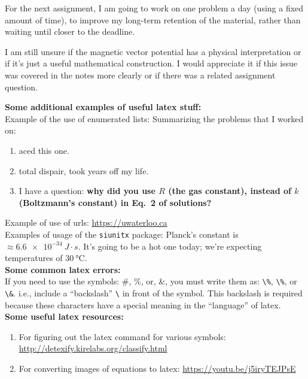 For the next assignment, I am going to work on one problem a day (using a fixed amount of time), to improve my long-term retention of the material, rather than waiting until closer to the deadline.

I am still unsure if the magnetic vector potential has a physical interpretation or if it's just a useful mathematical construction. I would appreciate it if this issue was covered in the notes more clearly or if there was a related assignment question.

\newpage

\noindent
{\bf Some additional examples of useful latex stuff:}\\

\noindent
Example of the use of enumerated lists:  Summarizing the problems that I worked on:
\begin{enumerate} \itemsep0em
\item aced this one.
\item total dispair, took years off my life.
\item I have a question: \textbf{why did you use $R$ (the gas constant), instead of $k$ (Boltzmann's constant) in Eq.~2 of solutions?}
\end{enumerate}

\noindent
Example of use of urls: \url{https://uwaterloo.ca}\\

\noindent
Examples of usage of the \verb$siunitx$ package: Planck's constant is $ \approx \SI{6.6e-34}{J \cdot s}$.  It's going to be a hot one today; we're expecting temperatures of $\SI{30}{\celsius}$.\\

\noindent
{\bf Some common latex errors:}\\

\noindent
If you need to use the symbols: \#, \%, or, \&, you must write them as: \verb$\%$, \verb$\%$, or \verb$\&$.  i.e., include a ``backslash'' \verb$\$ in front of the symbol.  This backslash is required because these characters have a special meaning in the ``language'' of latex.\\

\noindent
{\bf Some useful latex resources:}\\

\begin{enumerate}
\item
For figuring out the latex command for various symbols:
\url{http://detexify.kirelabs.org/classify.html}

\item
For converting images of equations to latex:
\url{https://youtu.be/j5iryTEJPsE}
\end{enumerate}

